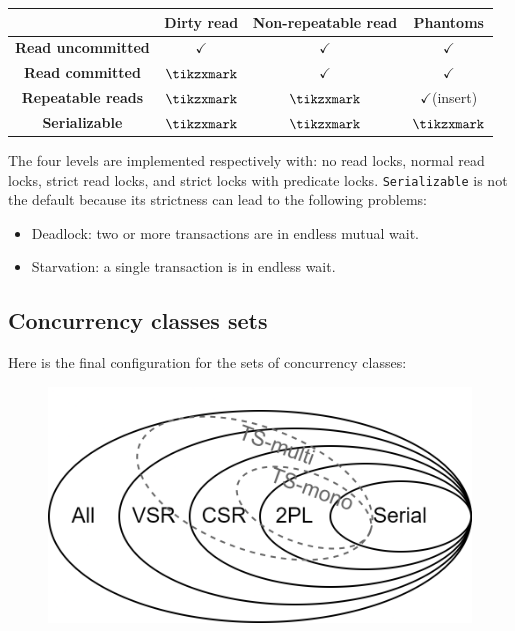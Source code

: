\begin{table}[H]
    \centering      
    \begin{tabular}{c|ccc|}
    \cline{2-4}
                                                    & \textbf{Dirty read} & \textbf{Non-repeatable read} & \textbf{Phantoms}    \\ \hline
    \multicolumn{1}{|c|}{\textbf{Read uncommitted}} & $\checkmark$        & $\checkmark$                 & $\checkmark$         \\
    \multicolumn{1}{|c|}{\textbf{Read committed}}   & $\tikzxmark$        & $\checkmark$                 & $\checkmark$         \\
    \multicolumn{1}{|c|}{\textbf{Repeatable reads}}  & $\tikzxmark$        & $\tikzxmark$                 & $\checkmark$(insert) \\
    \multicolumn{1}{|c|}{\textbf{Serializable}}     & $\tikzxmark$        & $\tikzxmark$                 & $\tikzxmark$         \\ \hline
    \end{tabular}
\end{table}
The four levels are implemented respectively with: no read locks, normal read locks, strict read locks, and strict locks with predicate locks. 
\texttt{Serializable} is not the default because its strictness can lead to the following problems:
\begin{itemize}
    \item Deadlock: two or more transactions are in endless mutual wait. 
    \item Starvation: a single transaction is in endless wait. 
\end{itemize}

\subsection{Concurrency classes sets}

Here is the final configuration for the sets of concurrency classes: 
\begin{figure}[H]
    \centering
    \includegraphics[width=0.65\linewidth]{images/set.png}
\end{figure}